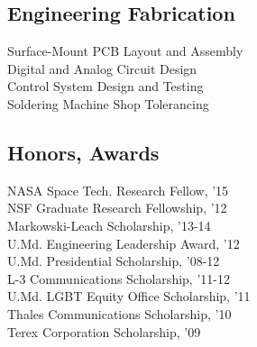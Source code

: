 \documentclass[letterpaper]{deedy-resume} %
\begin{document}
\begin{minipage}[t]{0.33\textwidth}
\sectionspace

\subsection{Engineering Fabrication}

Surface-Mount PCB Layout and Assembly\\
Digital and Analog Circuit Design\\
Control System Design and Testing\\
Soldering \textbullet{} Machine Shop \textbullet{} Tolerancing\\


\sectionspace %

\subsection{Honors, Awards}

NASA Space Tech. Research Fellow, '15\\
NSF Graduate Research Fellowship, '12\\
Markowski-Leach Scholarship, '13-14\\
U.Md. Engineering Leadership Award, '12\\
U.Md. Presidential Scholarship, '08-12\\
L-3 Communications Scholarship, '11-12\\
U.Md. LGBT Equity Office Scholarship, '11\\
Thales Communications Scholarship, '10\\
Terex Corporation Scholarship, '09\\

\end{minipage}%
\hfill
%
%
\end{document}
